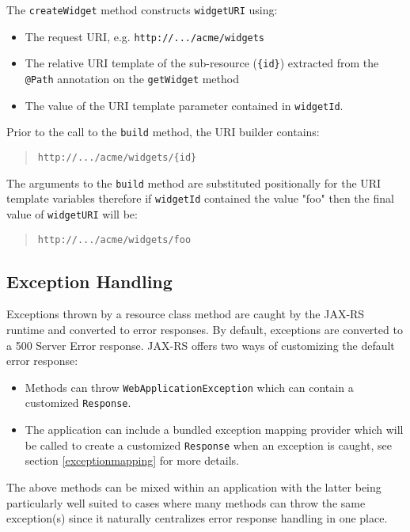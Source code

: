 \documentclass{acm_proc_article-sp}
\begin{document}
The \texttt{createWidget} method constructs \texttt{widgetURI} using:

\begin{itemize}
\item The request URI, e.g. \texttt{http://.../acme/widgets}
\item The relative URI template of the sub-resource (\texttt{\{id\}}) extracted from the \texttt{@Path} annotation on the \texttt{getWidget} method
\item The value of the URI template parameter contained in \texttt{widgetId}.
\end{itemize}

Prior to the call to the \texttt{build} method, the URI builder contains:
\begin{quotation}
\texttt{http://.../acme/widgets/\{id\}}
\end{quotation}

The arguments to the \texttt{build} method are substituted positionally for the URI template variables therefore if \texttt{widgetId} contained the value "foo" then the final value of \texttt{widgetURI} will be:
\begin{quotation}
\texttt{http://.../acme/widgets/foo}
\end{quotation}

\subsection{Exception Handling}

Exceptions thrown by a resource class method are caught by the JAX-RS runtime and converted to error responses. By default, exceptions are converted to a 500 Server Error response. JAX-RS offers two ways of customizing the default error response:

\begin{itemize}
\item Methods can throw \texttt{Web\-Application\-Exception} which can contain a customized \texttt{Response}.
\item The application can include a bundled exception mapping provider which will be called to create a customized \texttt{Response} when an exception is caught, see section \ref{exceptionmapping} for more details.
\end{itemize}

The above methods can be mixed within an application with the latter being particularly well suited to cases where many methods can throw the same exception(s) since it naturally centralizes error response handling in one place.
\end{document}
